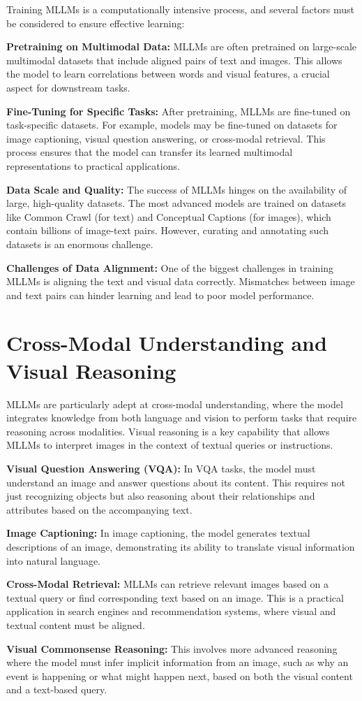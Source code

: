 Training MLLMs is a computationally intensive process, and several factors must be considered to ensure effective learning:

\textbf{Pretraining on Multimodal Data:} MLLMs are often pretrained on large-scale multimodal datasets that include aligned pairs of text and images. This allows the model to learn correlations between words and visual features, a crucial aspect for downstream tasks.

\textbf{Fine-Tuning for Specific Tasks:} After pretraining, MLLMs are fine-tuned on task-specific datasets. For example, models may be fine-tuned on datasets for image captioning, visual question answering, or cross-modal retrieval. This process ensures that the model can transfer its learned multimodal representations to practical applications.

\textbf{Data Scale and Quality:} The success of MLLMs hinges on the availability of large, high-quality datasets. The most advanced models are trained on datasets like Common Crawl (for text) and Conceptual Captions (for images), which contain billions of image-text pairs. However, curating and annotating such datasets is an enormous challenge.

\textbf{Challenges of Data Alignment:} One of the biggest challenges in training MLLMs is aligning the text and visual data correctly. Mismatches between image and text pairs can hinder learning and lead to poor model performance.

\section{Cross-Modal Understanding and Visual Reasoning}

MLLMs are particularly adept at cross-modal understanding, where the model integrates knowledge from both language and vision to perform tasks that require reasoning across modalities. Visual reasoning is a key capability that allows MLLMs to interpret images in the context of textual queries or instructions.

\textbf{Visual Question Answering (VQA):} In VQA tasks, the model must understand an image and answer questions about its content. This requires not just recognizing objects but also reasoning about their relationships and attributes based on the accompanying text.

\textbf{Image Captioning:} In image captioning, the model generates textual descriptions of an image, demonstrating its ability to translate visual information into natural language.

\textbf{Cross-Modal Retrieval:} MLLMs can retrieve relevant images based on a textual query or find corresponding text based on an image. This is a practical application in search engines and recommendation systems, where visual and textual content must be aligned.

\textbf{Visual Commonsense Reasoning:} This involves more advanced reasoning where the model must infer implicit information from an image, such as why an event is happening or what might happen next, based on both the visual content and a text-based query.
